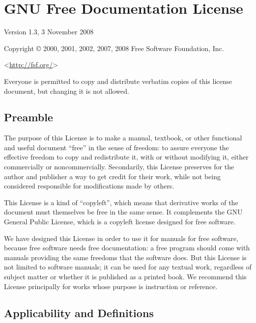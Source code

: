 \chapter{GNU Free Documentation License}

 \begin{center}

       Version 1.3, 3 November 2008


 Copyright \copyright{} 2000, 2001, 2002, 2007, 2008  Free Software Foundation, Inc.
 
 \smallskip
 
     <\url{http://fsf.org/}>
  
 \smallskip
 
 Everyone is permitted to copy and distribute verbatim copies
 of this license document, but changing it is not allowed.
\end{center}


\section*{Preamble}

The purpose of this License is to make a manual, textbook, or other
functional and useful document ``free'' in the sense of freedom: to
assure everyone the effective freedom to copy and redistribute it,
with or without modifying it, either commercially or noncommercially.
Secondarily, this License preserves for the author and publisher a way
to get credit for their work, while not being considered responsible
for modifications made by others.

This License is a kind of ``copyleft'', which means that derivative
works of the document must themselves be free in the same sense.  It
complements the GNU General Public License, which is a copyleft
license designed for free software.

We have designed this License in order to use it for manuals for free
software, because free software needs free documentation: a free
program should come with manuals providing the same freedoms that the
software does.  But this License is not limited to software manuals;
it can be used for any textual work, regardless of subject matter or
whether it is published as a printed book.  We recommend this License
principally for works whose purpose is instruction or reference.


\section{Applicability and Definitions}

